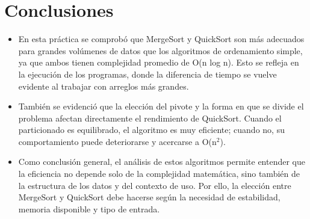 \documentclass{article}
\begin{document}
	\section{Conclusiones}

	\begin{itemize}
        \item En esta práctica se comprobó que MergeSort y QuickSort son más adecuados para grandes volúmenes de datos que los algoritmos de ordenamiento simple, ya que ambos tienen complejidad promedio de O(n log n). Esto se refleja en la ejecución de los programas, donde la diferencia de tiempo se vuelve evidente al trabajar con arreglos más grandes.

        \item También se evidenció que la elección del pivote y la forma en que se divide el problema afectan directamente el rendimiento de QuickSort. Cuando el particionado es equilibrado, el algoritmo es muy eficiente; cuando no, su comportamiento puede deteriorarse y acercarse a O(n$^2$).

        \item Como conclusión general, el análisis de estos algoritmos permite entender que la eficiencia no depende solo de la complejidad matemática, sino también de la estructura de los datos y del contexto de uso. Por ello, la elección entre MergeSort y QuickSort debe hacerse según la necesidad de estabilidad, memoria disponible y tipo de entrada.
	\end{itemize}

	
	
    
%
%
%
			
\end{document}
